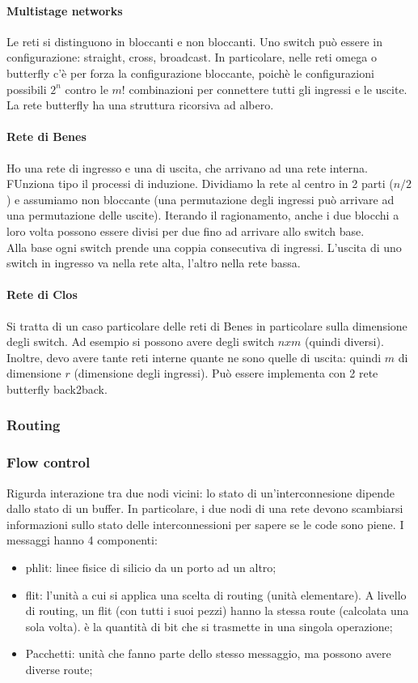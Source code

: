 \documentclass{article}
\begin{document}
\paragraph{Multistage networks}
Le reti si distinguono in bloccanti e non bloccanti. Uno switch può essere in configurazione: straight, cross, broadcast. In particolare, nelle reti omega o butterfly c'è per forza la configurazione bloccante, poichè le configurazioni possibili $2^n$ contro le $m!$ combinazioni per connettere tutti gli ingressi e le uscite.
La rete butterfly ha una struttura ricorsiva ad albero.

\paragraph{Rete di Benes}
Ho una rete di ingresso e una di uscita, che arrivano ad una rete interna. FUnziona tipo il processi di induzione. Dividiamo la rete al centro in 2 parti ($n/2$) e assumiamo non bloccante (una permutazione degli ingressi può arrivare ad una permutazione delle uscite). Iterando il ragionamento, anche i due blocchi a loro volta possono essere divisi per due fino ad arrivare allo switch base.\\
Alla base ogni switch prende una coppia consecutiva di ingressi. L'uscita di uno switch in ingresso va nella rete alta, l'altro nella rete bassa.

\paragraph{Rete di Clos}
Si tratta di un caso particolare delle reti di Benes in particolare sulla dimensione degli switch. Ad esempio si possono avere degli switch $nxm$ (quindi diversi). Inoltre, devo avere tante reti interne quante ne sono quelle di uscita: quindi $m$ di dimensione $r$ (dimensione degli ingressi). Può essere implementa con 2 rete butterfly back2back.

\subsubsection{Routing}

\subsubsection{Flow control}
Rigurda interazione tra due nodi vicini: lo stato di un'interconnesione dipende dallo stato di un buffer. In particolare, i due nodi di una rete devono scambiarsi informazioni sullo stato delle interconnessioni per sapere se le code sono piene. I messaggi hanno 4 componenti:
\begin{itemize}
    \item phlit: linee fisice di silicio da un porto ad un altro;
    \item flit: l'unità a cui si applica una scelta di routing (unità elementare). A livello di routing, un flit (con tutti i suoi pezzi) hanno la stessa route (calcolata una sola volta). è la quantità di bit che si trasmette in una singola operazione;
    \item Pacchetti: unità che fanno parte dello stesso messaggio, ma possono avere diverse route;
\end{itemize}
\end{document}
